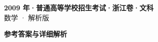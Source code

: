 \documentclass[zihao=-4, a4paper]{ctexart}
\begin{document}
\begin{center}
  {\Large\bfseries 2009 年·普通高等学校招生考试·浙江卷·文科}\\[4pt]
  {\large 数学 · 解析版}
\end{center}
\medskip
{}

\clearpage
{}
\begin{center}{\Large\bfseries 参考答案与详细解析}\end{center}
\medskip

\end{document}
